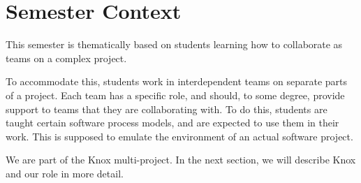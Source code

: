 \section{Semester Context}
This semester is thematically based on students learning how to collaborate as teams on a complex project.

To accommodate this, students work in interdependent teams on separate parts of a project. 
Each team has a specific role, and should, to some degree, provide support to teams that they are collaborating with.
To do this, students are taught certain software process models, and are expected to use them in their work.
This is supposed to emulate the environment of an actual software project. 

We are part of the Knox multi-project. In the next section, we will describe Knox and our role in more detail.
% 



% 
